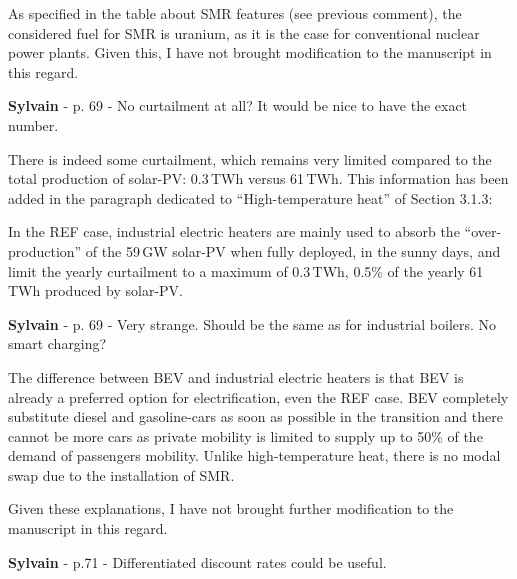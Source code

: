 \documentclass[12pt,a4paper]{article}
\begin{document}
\noindent As specified in the table about SMR features (see previous comment), the considered fuel for SMR is uranium, as it is the case for conventional nuclear power plants. Given this, I have not brought modification to the manuscript in this regard.

\begin{mdframed}[style=comment] %
{\color{purple} \textbf{Sylvain}} - p. 69 - No curtailment at all? It would be nice to have the exact number.
\end{mdframed}

\noindent There is indeed some curtailment, which remains very limited compared to the total production of solar-PV: 0.3\,TWh versus 61\,TWh. This information has been added {\color{blue}in the paragraph dedicated to ``High-temperature heat'' of Section 3.1.3}: 

\begin{mdframed}[style=manuscript] %
In the REF case, industrial electric heaters are mainly used to absorb the ``over-production'' of the 59\,GW solar-PV when fully deployed, in the sunny days, and limit the yearly curtailment to a maximum of 0.3\,TWh, 0.5\% of the yearly 61\,TWh produced by solar-PV.
\end{mdframed}

\begin{mdframed}[style=comment] %
{\color{purple} \textbf{Sylvain}} - p. 69 - Very strange. Should be the same as for industrial boilers. No smart charging?
\end{mdframed}

\noindent The difference between BEV and industrial electric heaters is that BEV is already a preferred option for electrification, even the REF case. BEV completely substitute diesel and gasoline-cars as soon as possible in the transition and there cannot be more cars as private mobility is limited to supply up to 50\% of the demand of passengers mobility. Unlike high-temperature heat, there is no modal swap due to the installation of SMR.

Given these explanations, I have not brought further modification to the manuscript in this regard.

\begin{mdframed}[style=comment] %
{\color{purple} \textbf{Sylvain}} - p.71 - Differentiated discount rates could be useful.
\end{mdframed}
\end{document}
